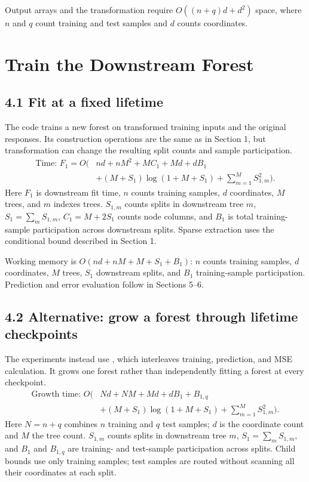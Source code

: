 \documentclass[11pt]{article}
\newcommand{\code}[1]{\texttt{\detokenize{#1}}}
\begin{document}
Output arrays and the transformation require $O((n+q)d+d^2)$ space, where
$n$ and $q$ count training and test samples and $d$ counts coordinates.

\section{Train the Downstream Forest}

\subsection*{4.1 Fit at a fixed lifetime}
The code trains a new forest on transformed training inputs and the original
responses. Its construction operations are the same as in Section 1, but
transformation can change the resulting split counts and sample participation.
\[
\begin{aligned}
\text{Time: }F_1=O\bigl(&nd+nM^2+MC_1+Md+dB_1\\
&+(M+S_1)\log(1+M+S_1)+\sum_{m=1}^{M}S_{1,m}^2\bigr).
\end{aligned}
\]
Here $F_1$ is downstream fit time, $n$ counts training samples, $d$ coordinates,
$M$ trees, and $m$ indexes trees. $S_{1,m}$ counts splits in downstream tree
$m$, $S_1=\sum_m S_{1,m}$, $C_1=M+2S_1$ counts node columns, and $B_1$ is total
training-sample participation across downstream splits. Sparse extraction
uses the conditional bound described in Section 1.

Working memory is $O(nd+nM+M+S_1+B_1)$: $n$ counts training samples, $d$
coordinates, $M$ trees, $S_1$ downstream splits, and $B_1$ training-sample
participation. Prediction and error evaluation follow in Sections 5--6.

\subsection*{4.2 Alternative: grow a forest through lifetime checkpoints}
The experiments instead use \code{evaluate_all_lifetimes}, which interleaves
training, prediction, and MSE calculation. It grows one forest rather than
independently fitting a forest at every checkpoint.
\[
\begin{aligned}
\text{Growth time: }O\bigl(&Nd+NM+Md+dB_1+B_{1,q}\\
&+(M+S_1)\log(1+M+S_1)+\sum_{m=1}^{M}S_{1,m}^2\bigr).
\end{aligned}
\]
Here $N=n+q$ combines $n$ training and $q$ test samples; $d$ is the coordinate
count and $M$ the tree count. $S_{1,m}$ counts splits in downstream tree $m$,
$S_1=\sum_m S_{1,m}$, and $B_1$ and $B_{1,q}$ are training- and test-sample
participation across splits. Child bounds use only training samples; test
samples are routed without scanning all their coordinates at each split.
\end{document}
